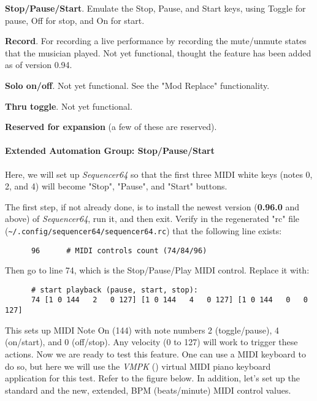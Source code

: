       \begin{enumber}
         \item \textbf{Stop/Pause/Start}.  Emulate the Stop, Pause, and
            Start keys, using Toggle for pause, Off for stop, and On for
            start.
         \item \textbf{Record}.  For recording a live performance by
            recording the mute/unmute states that the musician played.
            Not yet functional, thought the feature has been added as of
            version 0.94.
         \item \textbf{Solo on/off}.
            Not yet functional.  See the "Mod Replace" functionality.
         \item \textbf{Thru toggle}.
            Not yet functional.
         \item \textbf{Reserved for expansion} (a few of these are reserved).
      \end{enumber}

\paragraph{Extended Automation Group: Stop/Pause/Start}
\label{paragraph:seq64_rc_file_midi_ctrl_ex_stopps}

   Here, we will set up \textsl{Sequencer64} so that the first three MIDI
   white keys (notes 0, 2, and 4) will become "Stop", "Pause", and "Start"
   buttons.

   The first step, if not already done, is to install the newest version
   (\textbf{0.96.0} and above) of \textsl{Sequencer64},
   run it, and then exit.
   Verify in the regenerated "rc" file
   (\texttt{\textasciitilde/.config/sequencer64/sequencer64.rc}) that the
   following line exists:

   \begin{verbatim}
      96      # MIDI controls count (74/84/96)
   \end{verbatim}

   Then go to line 74, which is the Stop/Pause/Play MIDI control.
   Replace it with:

   \begin{verbatim}
      # start playback (pause, start, stop):
      74 [1 0 144   2   0 127] [1 0 144   4   0 127] [1 0 144   0   0 127]
   \end{verbatim}

   This sets up MIDI Note On (144) with note numbers 2 (toggle/pause),
   4 (on/start), and 0 (off/stop).
   Any velocity (0 to 127) will work to trigger these actions.
   Now we are ready to test this feature.  One can use a MIDI keyboard to do
   so, but here we will use the \textsl{VMPK} (\cite{vmpk}) virtual MIDI
   piano keyboard application for this test.  Refer to the figure below.
   In addition, let's set up the standard and the new, extended, BPM
   (beats/minute) MIDI control values.  

